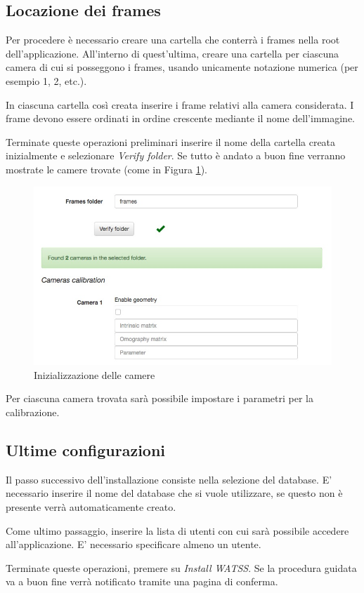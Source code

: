 \subsection{Locazione dei frames}

Per procedere è necessario creare una cartella che conterrà i frames nella root dell'applicazione.  All'interno di quest'ultima, creare una cartella per ciascuna camera di cui si posseggono i frames, usando unicamente notazione numerica (per esempio 1, 2, etc.).

In ciascuna cartella così creata inserire i frame relativi alla camera considerata. I frame devono essere ordinati in ordine crescente mediante il nome dell'immagine.

Terminate queste operazioni preliminari inserire il nome della cartella creata inizialmente e selezionare \emph{Verify folder}. Se tutto è andato a buon fine verranno mostrate le camere trovate (come in Figura \ref{fig:setup2}).

\begin{figure}[h]
\centering
\includegraphics[width=0.8\linewidth]{images/setup2.jpg}
  \caption{Inizializzazione delle camere}
  \label{fig:setup2}
\end{figure}

Per ciascuna camera trovata sarà possibile impostare i parametri per la calibrazione.

\subsection{Ultime configurazioni}

Il passo successivo dell'installazione consiste nella selezione del database. E' necessario inserire il nome del database che si vuole utilizzare, se questo non è presente verrà automaticamente creato.

Come ultimo passaggio, inserire la lista di utenti con cui sarà possibile accedere all'applicazione. E' necessario specificare almeno un utente.

Terminate queste operazioni, premere su \emph{Install WATSS}. Se la procedura guidata va a buon fine verrà notificato tramite una pagina di conferma.

